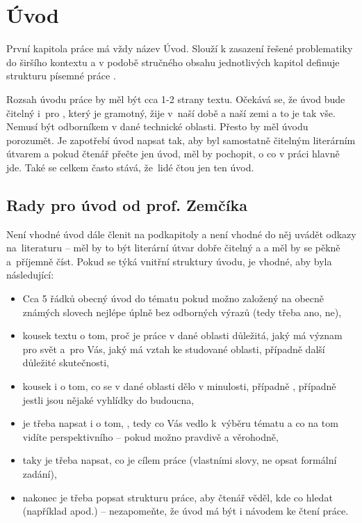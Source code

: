 \section{Úvod}
\label{uvod}

První kapitola práce má vždy název Úvod. Slouží k zasazení řešené problematiky do širšího kontextu a v podobě stručného obsahu jednotlivých kapitol definuje strukturu písemné práce \cite{fitWeb}.

Rozsah úvodu práce by měl být cca 1-2 strany textu. Očekává se, že úvod bude čitelný i~pro , který je gramotný, žije v~naší době a naší zemi a to je tak vše. Nemusí být odborníkem v dané technické oblasti. Přesto by měl úvodu porozumět. Je zapotřebí úvod napsat tak, aby byl samostatně čitelným literárním útvarem a pokud čtenář přečte jen úvod, měl by pochopit, o co v práci hlavně jde. Také se celkem často stává, že~lidé čtou jen ten úvod.

\subsection*{Rady pro úvod od prof. Zemčíka}
Není vhodné úvod dále členit na podkapitoly a není vhodné do něj uvádět odkazy na~literaturu -- měl by to být literární útvar dobře čitelný a  a měl by se pěkně a~příjemně číst. Pokud se týká vnitřní struktury úvodu, je vhodné, aby byla následující:
\begin{itemize}
  \item{Cca 5 řádků obecný úvod do tématu pokud možno založený na obecně známých slovech nejlépe úplně bez odborných výrazů (tedy třeba  ano,  ne),}
  \item{kousek textu o tom, proč je práce v dané oblasti důležitá, jaký má význam pro svět a~pro Vás, jaký má vztah ke studované oblasti, případně další důležité skutečnosti,}
  \item{kousek i o tom, co se v dané oblasti dělo v minulosti, případně , případně jestli jsou nějaké vyhlídky do budoucna,}
  \item{je třeba napsat i o tom, , tedy co Vás vedlo k~výběru tématu a co na tom vidíte perspektivního -- pokud možno pravdivě a věrohodně,}
  \item{taky je třeba napsat, co je cílem práce (vlastními slovy, ne opsat formální zadání),}
  \item{nakonec je třeba popsat strukturu práce, aby čtenář věděl, kde co hledat (například  apod.) -- nezapomeňte, že úvod má být i návodem ke čtení práce. }
\end{itemize}


